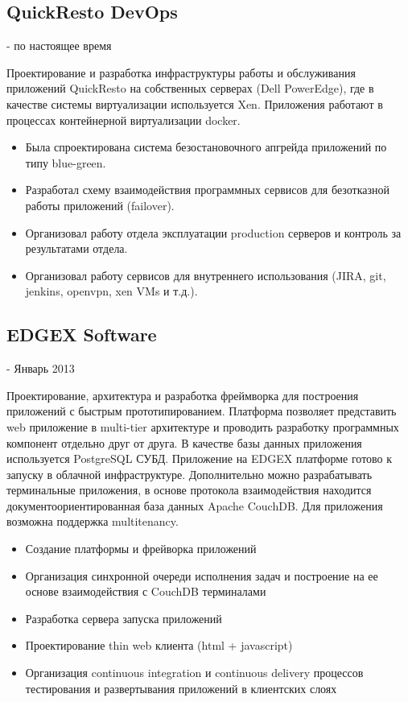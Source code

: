 \documentclass{article}
\begin{document}
\subsection*{QuickResto DevOps}
 - по настоящее время
\normalsize

Проектирование и разработка инфраструктуры работы и обслуживания приложений QuickResto на собственных серверах (Dell PowerEdge), где в качестве системы виртуализации используется Xen. Приложения работают в процессах контейнерной виртуализации docker.
\begin{itemize}
  \item Была спроектирована система безостановочного апгрейда приложений по типу blue-green.
  \item Разработал схему взаимодействия программных сервисов для безотказной работы приложений (failover).
  \item Организовал работу отдела эксплуатации production серверов и контроль за результатами отдела.
  \item Организовал работу сервисов для внутреннего использования (JIRA, git, jenkins, openvpn, xen VMs и т.д.).
\end{itemize}


\subsection*{EDGEX Software}
 - Январь 2013
\normalsize

Проектирование, архитектура и разработка фреймворка для построения приложений с быстрым прототипированием. Платформа позволяет представить web приложение в multi-tier архитектуре и проводить разработку программных компонент отдельно друг от друга. В качестве базы данных приложения используется PostgreSQL СУБД.
Приложение на EDGEX платформе готово к запуску в облачной инфраструктуре.
Дополнительно можно разрабатывать терминальные приложения, в основе протокола взаимодействия находится документоориентированная база данных Apache CouchDB. 
Для приложения возможна поддержка multitenancy.

\begin{itemize}
  \item Создание платформы и фрейворка приложений
  \item Организация синхронной очереди исполнения задач и построение на ее основе взаимодействия с CouchDB терминалами
  \item Разработка сервера запуска приложений
  \item Проектирование thin web клиента (html + javascript)
  \item Организация continuous integration и continuous delivery процессов тестирования и развертывания приложений в клиентских слоях
\end{itemize}
\end{document}
